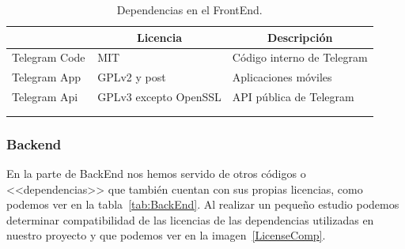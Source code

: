 \begin{longtable}[c]{@{}lll@{}}
\toprule
\centering
\multicolumn{1}{c}{\textbf{Nombre}} & \multicolumn{1}{c}{\textbf{Licencia}} & \multicolumn{1}{c}{\textbf{Descripción}} \\ \midrule
\endfirsthead
%
\endhead
%
\bottomrule
\endfoot
%
\endlastfoot
%
Telegram Code & MIT & Código interno de Telegram \\
Telegram App~\cite{misc:TelegramApp} & GPLv2 y post & Aplicaciones móviles \\
Telegram Api~\cite{misc:TelegramApi} & GPLv3 excepto OpenSSL & API pública de Telegram \\ \bottomrule \\
\caption{Dependencias en el FrontEnd.}
\label{tab:FrontEnd}
\end{longtable}

\subsubsection{Backend}
En la parte de BackEnd nos hemos servido de otros códigos o <<dependencias>> que también cuentan con sus propias licencias, como podemos ver en la tabla~\ref{tab:BackEnd}. Al realizar un pequeño estudio podemos determinar compatibilidad de las licencias de las dependencias utilizadas en nuestro proyecto y que podemos ver en la imagen~\ref{LicenseComp}.

